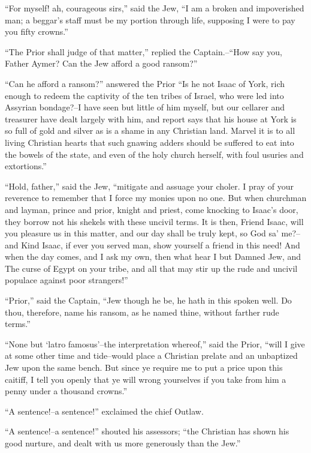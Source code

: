 ``For myself! ah, courageous sirs,'' said the Jew, ``I am a broken and
impoverished man; a beggar's staff must be my portion through life,
supposing I were to pay you fifty crowns.''

``The Prior shall judge of that matter,'' replied the Captain.--``How
say you, Father Aymer? Can the Jew afford a good ransom?''

``Can he afford a ransom?'' answered the Prior ``Is he not Isaac of
York, rich enough to redeem the captivity of the ten tribes of Israel,
who were led into Assyrian bondage?--I have seen but little of him
myself, but our cellarer and treasurer have dealt largely with him, and
report says that his house at York is so full of gold and silver as is a
shame in any Christian land. Marvel it is to all living Christian hearts
that such gnawing adders should be suffered to eat into the bowels of
the state, and even of the holy church herself, with foul usuries and
extortions.''

``Hold, father,'' said the Jew, ``mitigate and assuage your choler. I
pray of your reverence to remember that I force my monies upon no one.
But when churchman and layman, prince and prior, knight and priest, come
knocking to Isaac's door, they borrow not his shekels with these uncivil
terms. It is then, Friend Isaac, will you pleasure us in this matter,
and our day shall be truly kept, so God sa' me?--and Kind Isaac, if ever
you served man, show yourself a friend in this need! And when the day
comes, and I ask my own, then what hear I but Damned Jew, and The curse
of Egypt on your tribe, and all that may stir up the rude and uncivil
populace against poor strangers!''

``Prior,'' said the Captain, ``Jew though he be, he hath in this spoken
well. Do thou, therefore, name his ransom, as he named thine, without
farther rude terms.''

``None but `latro famosus'--the interpretation whereof,'' said the
Prior, ``will I give at some other time and tide--would place a
Christian prelate and an unbaptized Jew upon the same bench. But since
ye require me to put a price upon this caitiff, I tell you openly that
ye will wrong yourselves if you take from him a penny under a thousand
crowns.''

``A sentence!--a sentence!'' exclaimed the chief Outlaw.

``A sentence!--a sentence!'' shouted his assessors; ``the Christian has
shown his good nurture, and dealt with us more generously than the
Jew.''


